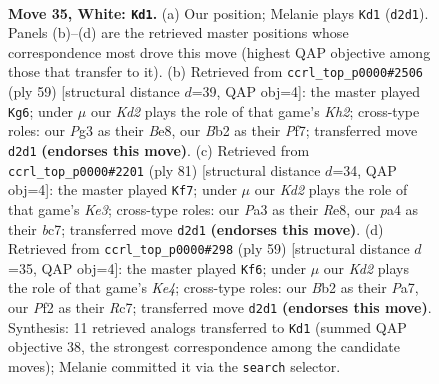 \documentclass[11pt]{article}
\begin{document}
\clearpage

\begin{figure}[p]\centering
\begin{subfigure}{0.46\textwidth}\centering
\resizebox{\linewidth}{!}{%
\newchessgame
\chessboard[
  setfen={7r/3n1k2/8/8/p1p1p3/P1P3Pp/1BPK1P1P/R7 w - - 3 35},
  showmover=false,
  pgfstyle=straightmove, color=movearrow, markmove={d2-d1}
]}
\caption{}
\end{subfigure}\hfill
\begin{subfigure}{0.46\textwidth}\centering
\resizebox{\linewidth}{!}{%
\newchessgame
\chessboard[
  setfen={r3b3/5ppk/4p3/6Pp/p6P/P3PP2/8/2R1B1K1 b - - 0 30},
  showmover=false,
  pgfstyle=straightmove, color=movearrow, markmove={h7-g6}
]}
\caption{}
\end{subfigure}
\\[4pt]
\begin{subfigure}{0.46\textwidth}\centering
\resizebox{\linewidth}{!}{%
\newchessgame
\chessboard[
  setfen={4r3/1pB5/p1b1kp2/3p2p1/3P2P1/P4P2/P5K1/4R3 b - - 3 41},
  showmover=false,
  pgfstyle=straightmove, color=movearrow, markmove={e6-f7}
]}
\caption{}
\end{subfigure}\hfill
\begin{subfigure}{0.46\textwidth}\centering
\resizebox{\linewidth}{!}{%
\newchessgame
\chessboard[
  setfen={8/p1rb4/B1p1p3/4kpp1/PP6/4RPP1/2P5/2K5 b - - 1 30},
  showmover=false,
  pgfstyle=straightmove, color=movearrow, markmove={e5-f6}
]}
\caption{}
\end{subfigure}
\caption{\textbf{Move 35, White: \texttt{Kd1}.} (a) Our position; Melanie plays \texttt{Kd1} (\texttt{d2d1}). Panels (b)--(d) are the retrieved master positions whose correspondence most drove this move (highest QAP objective among those that transfer to it). (b) Retrieved from \texttt{ccrl\_top\_p0000\#2506} (ply 59) [structural distance $d$=39, QAP obj=4]: the master played \texttt{Kg6}; under $\mu$ our \emph{Kd2} plays the role of that game's \emph{Kh2}; cross-type roles: our \emph{P}g3 as their \emph{B}e8, our \emph{B}b2 as their \emph{P}f7; transferred move \texttt{d2d1} \textbf{(endorses this move)}. (c) Retrieved from \texttt{ccrl\_top\_p0000\#2201} (ply 81) [structural distance $d$=34, QAP obj=4]: the master played \texttt{Kf7}; under $\mu$ our \emph{Kd2} plays the role of that game's \emph{Ke3}; cross-type roles: our \emph{P}a3 as their \emph{R}e8, our \emph{p}a4 as their \emph{b}c7; transferred move \texttt{d2d1} \textbf{(endorses this move)}. (d) Retrieved from \texttt{ccrl\_top\_p0000\#298} (ply 59) [structural distance $d$=35, QAP obj=4]: the master played \texttt{Kf6}; under $\mu$ our \emph{Kd2} plays the role of that game's \emph{Ke4}; cross-type roles: our \emph{B}b2 as their \emph{P}a7, our \emph{P}f2 as their \emph{R}c7; transferred move \texttt{d2d1} \textbf{(endorses this move)}. Synthesis: 11 retrieved analogs transferred to \texttt{Kd1} (summed QAP objective 38, the strongest correspondence among the candidate moves); Melanie committed it via the \texttt{search} selector.}
\label{fig:thought-m68}
\end{figure}
\end{document}
